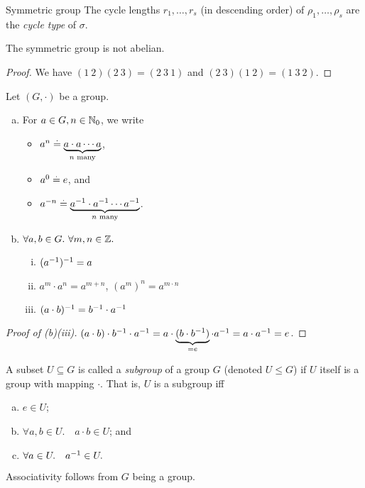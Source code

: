 \begin{ex}{Symmetric group}{}
The cycle lengths $r_1, \dots, r_s$ (in descending order) of $\rho_1, \dots, \rho_s$ are the \emph{cycle type} of $\sigma$.

\begin{rmk}
The symmetric group is not abelian.
\end{rmk}\vspace{-20pt}\begin{proof}
We have $(1\ 2)(2\ 3) = (2\ 3\ 1)$ and $(2\ 3)(1\ 2) = (1\ 3\ 2)$.
\end{proof}
\end{ex}

\begin{lem}
Let $(G,\cdot)$ be a group. \begin{enumerate}[(a),leftmargin=2\parindent]
    \item For $a \in G, n \in \mathbb{N}_0$, we write \begin{itemize}
        \item $a^n \overset{.}{=} \underbrace{a \cdot a \cdots a}_{\text{$n$ many}}$,
        \item $a^0 \overset{.}{=} e$, and
        \item $a^{-n} \overset{.}{=} \underbrace{a^{-1} \cdot a^{-1} \cdots a^{-1}}_{\text{$n$ many}}$.
    \end{itemize}
    
    \item $\forall a, b \in G.\ \forall m, n \in \mathbb{Z}.$ \begin{enumerate}[(i)]
        \item $(a^{-1})^{-1} = a$
        \item $a^m \cdot a^n = a^{m+n}$, $(a^m)^n = a^{m \cdot n}$
        \item $(a \cdot b)^{-1} = b^{-1} \cdot a^{-1}$
    \end{enumerate}
\end{enumerate}
\end{lem}
\begin{proof}[Proof of (b)(iii)] $(a \cdot b) \cdot b^{-1} \cdot a^{-1} = a \cdot \underbrace{(b \cdot b^{-1})}_{=e} \cdot a^{-1} = a \cdot a^{-1} = e$.
\end{proof}

\begin{defn}[Subgroup]
A subset $U \subseteq G$ is called a \emph{subgroup} of a group $G$ (denoted $U \leq G$) if $U$ itself is a group with mapping $\cdot$. That is, $U$ is a subgroup iff \begin{enumerate}[(a),leftmargin=2\parindent]
    \item $e \in U$; 
    \item $\forall a, b \in U.\quad a \cdot b \in U$; and 
    \item $\forall a \in U.\quad a^{-1} \in U.$ 
\end{enumerate} Associativity follows from $G$ being a group.
\end{defn}

